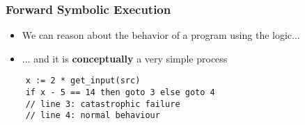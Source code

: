 \begin{frame}[fragile]
	\frametitle{Forward Symbolic Execution}
	\begin{itemize}
		\item We can reason about the behavior of a program using the logic...
		\item ... and it is \textbf{conceptually} a very simple process
	\end{itemize}
	\begin{lstlisting}
	x := 2 * get_input(src)
	if x - 5 == 14 then goto 3 else goto 4
	// line 3: catastrophic failure
	// line 4: normal behaviour
	\end{lstlisting}
\end{frame}